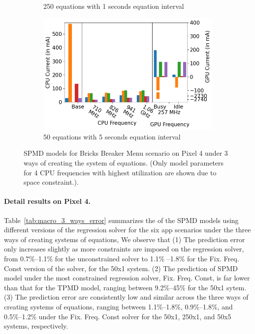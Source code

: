 \begin{figure}[tb]
\begin{subfigure}[b]{0.32\textwidth}
         \caption{250 equations with 1 seconds equation interval}
         \label{fig:macro_3_ways_250_1}
     \end{subfigure}
    \begin{subfigure}[b]{0.32\textwidth}
         \centering
         \includegraphics[width=\textwidth]{figures/004_Pixel4_bricksbreaker_menu_250_5_equations.png}
         \caption{50 equations with 5 seconds equation interval}
         \label{fig:macro_3_ways_50_5}
     \end{subfigure}
         \caption{SPMD models for Bricks Breaker Menu scenario on Pixel 4 under
         3 ways of creating the system of equations. 
         (Only model parameters for 4 CPU frequencies with highest utilization are shown due to space constraint.).}
    \label{fig:macro_3_ways}
    \vspace{-0.1in}
\end{figure}

\paragraph{Detail results on Pixel 4.}
Table~\ref{tab:macro_3_ways_error} summarizes the  of the SPMD models using different
versions of the regression solver for the six app scenarios under the
three ways of creating systems of equations, 
We observe that (1) The prediction error only increases slightly as
more constraints are imposed on the regression solver,
\eg from 0.7\%--1.1\% for the unconstrained solver to  1.1\% --1.8\% for
the Fix. Freq. Const version of the solver, for the 50x1 system.
(2) The prediction of SPMD model under the most constrained regression solver,
Fix. Freq. Const, is far lower than that for the TPMD model, \eg ranging
between 9.2\%--45\% for the 50x1 sytem.
(3) The prediction error are consistently low and similar across the
three ways of creating systems of equations, ranging between
1.1\%--1.8\%, 0.9\%--1.8\%, and 0.5\%--1.2\% under the Fix. Freq. Const solver
for the 50x1, 250x1, and 50x5 systems, respectively.

